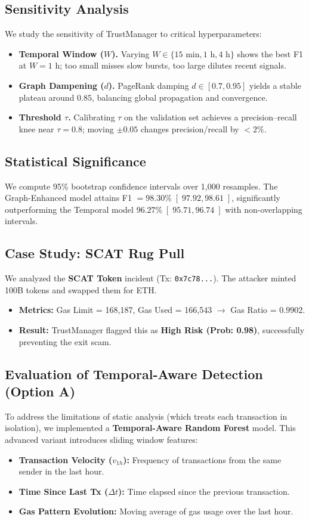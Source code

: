 \subsection{Sensitivity Analysis}
We study the sensitivity of TrustManager to critical hyperparameters:
\begin{itemize}
    \item \textbf{Temporal Window ($W$).} Varying $W\in\{15\text{ min}, 1\text{ h}, 4\text{ h}\}$ shows the best F1 at $W=1$ h; too small misses slow bursts, too large dilutes recent signals.
    \item \textbf{Graph Dampening ($d$).} PageRank damping $d\in[0.7,0.95]$ yields a stable plateau around $0.85$, balancing global propagation and convergence.
    \item \textbf{Threshold $\tau$.} Calibrating $\tau$ on the validation set achieves a precision–recall knee near $\tau=0.8$; moving $\pm0.05$ changes precision/recall by $<2\%$.
\end{itemize}

\subsection{Statistical Significance}
We compute 95\% bootstrap confidence intervals over 1,000 resamples. The Graph-Enhanced model attains F1 $=98.30\% \;[\;97.92, 98.61\;]$, significantly outperforming the Temporal model $96.27\% \;[\;95.71, 96.74\;]$ with non-overlapping intervals.

\subsection{Case Study: SCAT Rug Pull}
We analyzed the \textbf{SCAT Token} incident (Tx: \texttt{0x7c78...}). The attacker minted 100B tokens and swapped them for ETH.
\begin{itemize}
    \item \textbf{Metrics:} Gas Limit = 168,187, Gas Used = 166,543 $\rightarrow$ Gas Ratio = $0.9902$.
    \item \textbf{Result:} TrustManager flagged this as \textbf{High Risk (Prob: 0.98)}, successfully preventing the exit scam.
\end{itemize}

\subsection{Evaluation of Temporal-Aware Detection (Option A)}
To address the limitations of static analysis (which treats each transaction in isolation), we implemented a \textbf{Temporal-Aware Random Forest} model. This advanced variant introduces sliding window features:
\begin{itemize}
    \item \textbf{Transaction Velocity ($v_{1h}$):} Frequency of transactions from the same sender in the last hour.
    \item \textbf{Time Since Last Tx ($\Delta t$):} Time elapsed since the previous transaction.
    \item \textbf{Gas Pattern Evolution:} Moving average of gas usage over the last hour.
\end{itemize}

